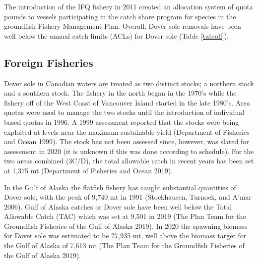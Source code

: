 \documentclass[11pt,
  english,
  a4paper,
]{article}
\begin{document}
\leavevmode\tagmcend\tagstructend\par


The introduction of the IFQ fishery in 2011 created an allocation system of quota pounds to vessels participating in the catch share program for species in the groundfish Fishery Management Plan. Overall, Dover sole removals have been well below the annual catch limits (ACLs) for Dover sole (Table \ref{tab:ofl}).

\leavevmode\tagmcend\tagstructend\par


\hypertarget{foreign-fisheries}{%
\subsection{Foreign Fisheries}\label{foreign-fisheries}}

\leavevmode\tagmcend\tagstructend


Dover sole in Canadian waters are treated as two distinct stocks; a northern stock and a southern stock. The fishery in the north began in the 1970's while the fishery off of the West Coast of Vancouver Island started in the late 1980's. Area quotas were used to manage the two stocks until the introduction of individual based quotas in 1996. A 1999 assessment reported that the stocks were being exploited at levels near the maximum sustainable yield {(Department of Fisheries and Ocean 1999)\leavevmode\tagmcend\tagstructend}. The stock has not been assessed since, however, was slated for assessment in 2020 (it is unknown if this was done according to schedule). For the two areas combined (3C/D), the total allowable catch in recent years has been set at 1,375 mt {(Department of Fisheries and Ocean 2019)\leavevmode\tagmcend\tagstructend}.

\leavevmode\tagmcend\tagstructend\par


In the Gulf of Alaska the flatfish fishery has caught substantial quantities of Dover sole, with the peak of 9,740 mt in 1991 {(Stockhausen, Turnock, and A'mar 2006)\leavevmode\tagmcend\tagstructend}. Gulf of Alaska catches or Dover sole have been well below the Total Allowable Catch (TAC) which was set at 9,501 in 2019 {(The Plan Team for the Groundfish Fisheries of the Gulf of Alaska 2019)\leavevmode\tagmcend\tagstructend}. In 2020 the spawning biomass for Dover sole was estimated to be 27,935 mt, well above the biomass target for the Gulf of Alaska of 7,613 mt {(The Plan Team for the Groundfish Fisheries of the Gulf of Alaska 2019)\leavevmode\tagmcend\tagstructend}.
\end{document}
